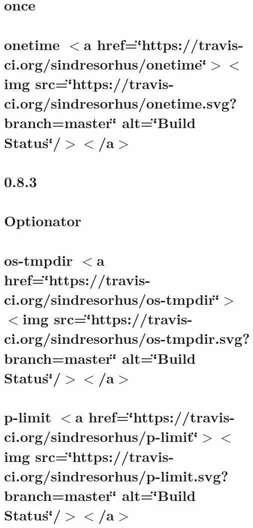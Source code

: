 \let\mypdfximage\pdfximage\def\pdfximage{\immediate\mypdfximage}\documentclass[twoside]{book}
\newcommand{\+}{\discretionary{\mbox{\scriptsize$\hookleftarrow$}}{}{}}
\begin{document}
\chapter{once}
\label{md_heap-visualizer_node_modules_once__r_e_a_d_m_e}

\chapter{onetime $<$a href=\char`\"{}https\+://travis-\/ci.\+org/sindresorhus/onetime\char`\"{}$>$$<$img src=\char`\"{}https\+://travis-\/ci.\+org/sindresorhus/onetime.\+svg?branch=master\char`\"{} alt=\char`\"{}\+Build Status\char`\"{}/$>$$<$/a$>$}
\label{md_heap-visualizer_node_modules_onetime_readme}

\chapter{0.8.3}
\label{md_heap-visualizer_node_modules_optionator__c_h_a_n_g_e_l_o_g}

\chapter{Optionator}
\label{md_heap-visualizer_node_modules_optionator__r_e_a_d_m_e}

\chapter{os-\/tmpdir $<$a href=\char`\"{}https\+://travis-\/ci.\+org/sindresorhus/os-\/tmpdir\char`\"{}$>$$<$img src=\char`\"{}https\+://travis-\/ci.\+org/sindresorhus/os-\/tmpdir.\+svg?branch=master\char`\"{} alt=\char`\"{}\+Build Status\char`\"{}/$>$$<$/a$>$}
\label{md_heap-visualizer_node_modules_os-tmpdir_readme}

\chapter{p-\/limit $<$a href=\char`\"{}https\+://travis-\/ci.\+org/sindresorhus/p-\/limit\char`\"{}$>$$<$img src=\char`\"{}https\+://travis-\/ci.\+org/sindresorhus/p-\/limit.\+svg?branch=master\char`\"{} alt=\char`\"{}\+Build Status\char`\"{}/$>$$<$/a$>$}
\label{md_heap-visualizer_node_modules_p-limit_readme}

\end{document}
